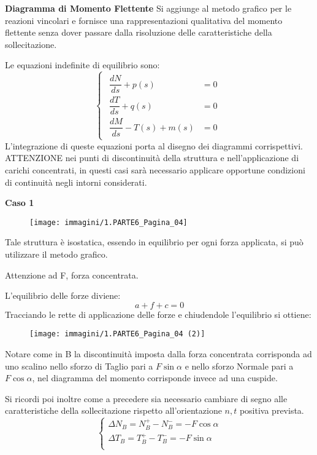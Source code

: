 \documentclass{article}
\begin{document}
\begin{adjustwidth}{2in}{}
{\Large \textbf{Diagramma di Momento Flettente}} \mbox{} \newline
	Si aggiunge al metodo grafico per le reazioni vincolari e fornisce una rappresentazioni qualitativa del momento flettente senza dover passare dalla risoluzione delle caratteristiche della sollecitazione. 
	 
	Le equazioni indefinite di equilibrio sono: 
\[ \begin{cases}
\begin{aligned}
	\dfrac{dN}{ds} + p(s)  &= 0 \\
\dfrac{dT}{ds} + q(s)  &= 0 \\
\dfrac{dM}{ds} - T(s) + m(s)  &= 0 
\end{aligned}
\end{cases}
\]
	L'integrazione di queste equazioni porta al disegno dei diagrammi corrispettivi. ATTENZIONE nei punti di discontinuità della struttura e nell'applicazione di carichi concentrati, in questi casi sarà necessario applicare opportune condizioni di continuità negli intorni considerati. \newline

\textbf{Caso 1} 
	
\begin{figure}[H]
	\centering
	\texttt{[image: immagini/1.PARTE6\_Pagina\_04]}
\end{figure}
	Tale struttura è isostatica, essendo in equilibrio per ogni forza applicata, si può utilizzare il metodo grafico. 
	
	Attenzione ad F, forza concentrata. \newline 
	
	L'equilibrio delle forze diviene:
	\[a + f +c =0\] 
	Tracciando le rette di applicazione delle forze e chiudendole l'equilibrio si ottiene: 
\begin{figure}[H]
	\centering
	\texttt{[image: immagini/1.PARTE6\_Pagina\_04 (2)]}
\end{figure}
		Notare come in B la discontinuità imposta dalla forza concentrata corrisponda ad uno scalino nello sforzo di Taglio pari a $F\sin\alpha$ e nello sforzo Normale pari a $F\cos\alpha$, nel diagramma del momento corrisponde invece ad una cuspide.
		
	Si ricordi poi inoltre come a precedere sia necessario cambiare di segno alle caratteristiche della sollecitazione rispetto all'orientazione $n,t$ positiva prevista. 
 	\[ \begin{cases}
 		\Delta N_B = N_B^+ - N_B^- = -F\cos\alpha \\
 		 \Delta T_B = T_B^+ - T_B^- = -F\sin\alpha \\
 	\end{cases} \]
 

\end{adjustwidth}
\end{document}
